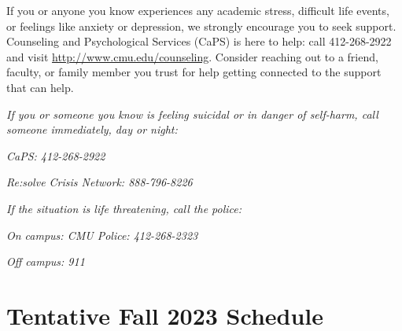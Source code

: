 \documentclass[11pt,letterpaper]{article}
\begin{document}
\medskip
\noindent
If you or anyone you know experiences any academic stress, difficult life events, or feelings like anxiety or depression, we strongly encourage you to seek support. Counseling and Psychological Services (CaPS) is here to help: call 412-268-2922 and visit \href{http://www.cmu.edu/counseling}{http://www.cmu.edu/counseling}. Consider reaching out to a friend, faculty, or family member you trust for help getting connected to the support that can help.

\medskip
\noindent
\textit{If you or someone you know is feeling suicidal or in danger of self-harm, call someone immediately, day or night:}

\textit{CaPS: 412-268-2922}

\textit{Re:solve Crisis Network: 888-796-8226}

\medskip
\noindent
\textit{If the situation is life threatening, call the police:}

\textit{On campus: CMU Police: 412-268-2323}

\textit{Off campus: 911}


\section*{Tentative Fall 2023 Schedule}
\end{document}

